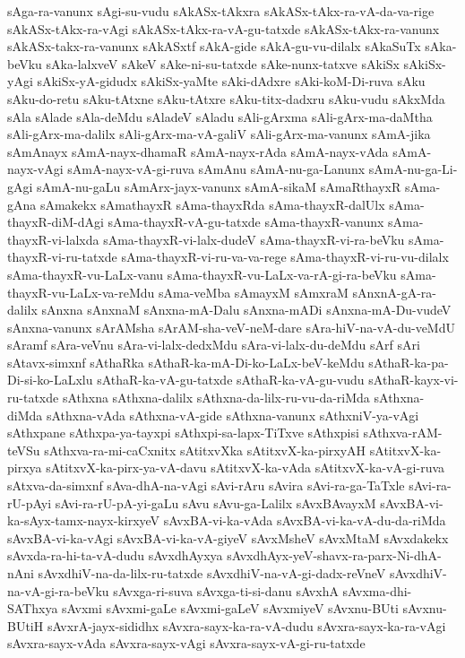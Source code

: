 {sAga-ra-vanunx
sAgi-su-vudu
sAkASx-tAkxra
sAkASx-tAkx-ra-vA-da-va-rige
sAkASx-tAkx-ra-vAgi
sAkASx-tAkx-ra-vA-gu-tatxde
sAkASx-tAkx-ra-vanunx
sAkASx-takx-ra-vanunx
sAkASxtf
sAkA-gide
sAkA-gu-vu-dilalx
sAkaSuTx
sAka-beVku
sAka-lalxveV
sAkeV
sAke-ni-su-tatxde
sAke-nunx-tatxve
sAkiSx
sAkiSx-yAgi
sAkiSx-yA-gidudx
sAkiSx-yaMte
sAki-dAdxre
sAki-koM-Di-ruva
sAku
sAku-do-retu
sAku-tAtxne
sAku-tAtxre
sAku-titx-dadxru
sAku-vudu
sAkxMda
sAla
sAlade
sAla-deMdu
sAladeV
sAladu
sAli-gArxma
sAli-gArx-ma-daMtha
sAli-gArx-ma-dalilx
sAli-gArx-ma-vA-galiV
sAli-gArx-ma-vanunx
sAmA-jika
sAmAnayx
sAmA-nayx-dhamaR
sAmA-nayx-rAda
sAmA-nayx-vAda
sAmA-nayx-vAgi
sAmA-nayx-vA-gi-ruva
sAmAnu
sAmA-nu-ga-Lanunx
sAmA-nu-ga-Li-gAgi
sAmA-nu-gaLu
sAmArx-jayx-vanunx
sAmA-sikaM
sAmaRthayxR
sAma-gAna
sAmakekx
sAmathayxR
sAma-thayxRda
sAma-thayxR-dalUlx
sAma-thayxR-diM-dAgi
sAma-thayxR-vA-gu-tatxde
sAma-thayxR-vanunx
sAma-thayxR-vi-lalxda
sAma-thayxR-vi-lalx-dudeV
sAma-thayxR-vi-ra-beVku
sAma-thayxR-vi-ru-tatxde
sAma-thayxR-vi-ru-va-va-rege
sAma-thayxR-vi-ru-vu-dilalx
sAma-thayxR-vu-LaLx-vanu
sAma-thayxR-vu-LaLx-va-rA-gi-ra-beVku
sAma-thayxR-vu-LaLx-va-reMdu
sAma-veMba
sAmayxM
sAmxraM
sAnxnA-gA-ra-dalilx
sAnxna
sAnxnaM
sAnxna-mA-Dalu
sAnxna-mADi
sAnxna-mA-Du-vudeV
sAnxna-vanunx
sArAMsha
sArAM-sha-veV-neM-dare
sAra-hiV-na-vA-du-veMdU
sAramf
sAra-veVnu
sAra-vi-lalx-dedxMdu
sAra-vi-lalx-du-deMdu
sArf
sAri
sAtavx-simxnf
sAthaRka
sAthaR-ka-mA-Di-ko-LaLx-beV-keMdu
sAthaR-ka-pa-Di-si-ko-LaLxlu
sAthaR-ka-vA-gu-tatxde
sAthaR-ka-vA-gu-vudu
sAthaR-kayx-vi-ru-tatxde
sAthxna
sAthxna-dalilx
sAthxna-da-lilx-ru-vu-da-riMda
sAthxna-diMda
sAthxna-vAda
sAthxna-vA-gide
sAthxna-vanunx
sAthxniV-ya-vAgi
sAthxpane
sAthxpa-ya-tayxpi
sAthxpi-sa-lapx-TiTxve
sAthxpisi
sAthxva-rAM-teVSu
sAthxva-ra-mi-caCxnitx
sAtitxvXka
sAtitxvX-ka-pirxyAH
sAtitxvX-ka-pirxya
sAtitxvX-ka-pirx-ya-vA-davu
sAtitxvX-ka-vAda
sAtitxvX-ka-vA-gi-ruva
sAtxva-da-simxnf
sAva-dhA-na-vAgi
sAvi-rAru
sAvira
sAvi-ra-ga-TaTxle
sAvi-ra-rU-pAyi
sAvi-ra-rU-pA-yi-gaLu
sAvu
sAvu-ga-Lalilx
sAvxBAvayxM
sAvxBA-vi-ka-sAyx-tamx-nayx-kirxyeV
sAvxBA-vi-ka-vAda
sAvxBA-vi-ka-vA-du-da-riMda
sAvxBA-vi-ka-vAgi
sAvxBA-vi-ka-vA-giyeV
sAvxMsheV
sAvxMtaM
sAvxdakekx
sAvxda-ra-hi-ta-vA-dudu
sAvxdhAyxya
sAvxdhAyx-yeV-shavx-ra-parx-Ni-dhA-nAni
sAvxdhiV-na-da-lilx-ru-tatxde
sAvxdhiV-na-vA-gi-dadx-reVneV
sAvxdhiV-na-vA-gi-ra-beVku
sAvxga-ri-suva
sAvxga-ti-si-danu
sAvxhA
sAvxma-dhi-SAThxya
sAvxmi
sAvxmi-gaLe
sAvxmi-gaLeV
sAvxmiyeV
sAvxnu-BUti
sAvxnu-BUtiH
sAvxrA-jayx-sididhx
sAvxra-sayx-ka-ra-vA-dudu
sAvxra-sayx-ka-ra-vAgi
sAvxra-sayx-vAda
sAvxra-sayx-vAgi
sAvxra-sayx-vA-gi-ru-tatxde
}
